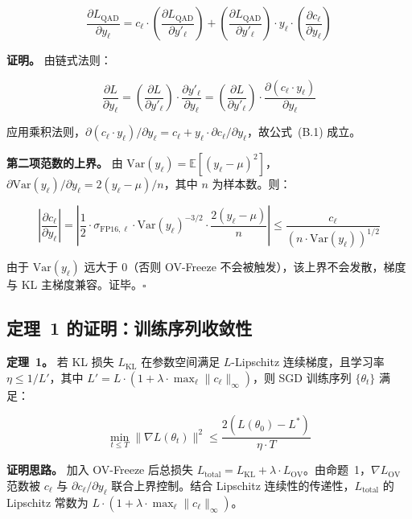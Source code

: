\documentclass[UTF8,a4paper,10pt,twocolumn]{ctexart}
\theoremstyle{plain}
\newcommand{\Var}{\mathrm{Var}}
\newcommand{\E}{\mathbb{E}}
\begin{document}
\begin{equation}\tag{B.1}
\frac{\partial L_{\mathrm{QAD}}}{\partial y_\ell} = c_\ell \cdot \left(\frac{\partial L_{\mathrm{QAD}}}{\partial y'_\ell}\right) + \left(\frac{\partial L_{\mathrm{QAD}}}{\partial y'_\ell}\right) \cdot y_\ell \cdot \left(\frac{\partial c_\ell}{\partial y_\ell}\right)
\end{equation}

\textbf{证明。} 由链式法则：

\begin{equation*}
\frac{\partial L}{\partial y_\ell} = \left(\frac{\partial L}{\partial y'_\ell}\right) \cdot \frac{\partial y'_\ell}{\partial y_\ell} = \left(\frac{\partial L}{\partial y'_\ell}\right) \cdot \frac{\partial (c_\ell \cdot y_\ell)}{\partial y_\ell}
\end{equation*}

应用乘积法则，$\partial (c_\ell \cdot y_\ell) / \partial y_\ell = c_\ell + y_\ell \cdot \partial c_\ell / \partial y_\ell$，故公式~(B.1) 成立。

\textbf{第二项范数的上界。} 由 $\Var(y_\ell) = \E[(y_\ell - \mu)^2]$，$\partial \Var(y_\ell) / \partial y_\ell = 2(y_\ell - \mu) / n$，其中 $n$ 为样本数。则：

\begin{equation*}
\left|\frac{\partial c_\ell}{\partial y_\ell}\right| = \left| \frac{1}{2} \cdot \sigma_{\mathrm{FP16},\ell} \cdot \Var(y_\ell)^{-3/2} \cdot \frac{2(y_\ell - \mu)}{n} \right| \leq \frac{c_\ell}{(n \cdot \Var(y_\ell))^{1/2}}
\end{equation*}

由于 $\Var(y_\ell)$ 远大于 0（否则 OV-Freeze 不会被触发），该上界不会发散，梯度与 KL 主梯度兼容。证毕。$\square$

\subsection{定理~1 的证明：训练序列收敛性}

\textbf{定理~1。} 若 KL 损失 $L_{\mathrm{KL}}$ 在参数空间满足 $L$-Lipschitz 连续梯度，且学习率 $\eta \leq 1/L'$，其中 $L' = L \cdot (1 + \lambda \cdot \max_\ell \|c_\ell\|_\infty)$，则 SGD 训练序列 $\{\theta_t\}$ 满足：

\begin{equation}\tag{B.2}
\min_{t \leq T} \|\nabla L(\theta_t)\|^2 \leq \frac{2(L(\theta_0) - L^*)}{\eta \cdot T}
\end{equation}

\textbf{证明思路。} 加入 OV-Freeze 后总损失 $L_{\mathrm{total}} = L_{\mathrm{KL}} + \lambda \cdot L_{\mathrm{OV}}$。由命题~1，$\nabla L_{\mathrm{OV}}$ 范数被 $c_\ell$ 与 $\partial c_\ell / \partial y_\ell$ 联合上界控制。结合 Lipschitz 连续性的传递性，$L_{\mathrm{total}}$ 的 Lipschitz 常数为 $L \cdot (1 + \lambda \cdot \max_\ell \|c_\ell\|_\infty)$。
\end{document}
